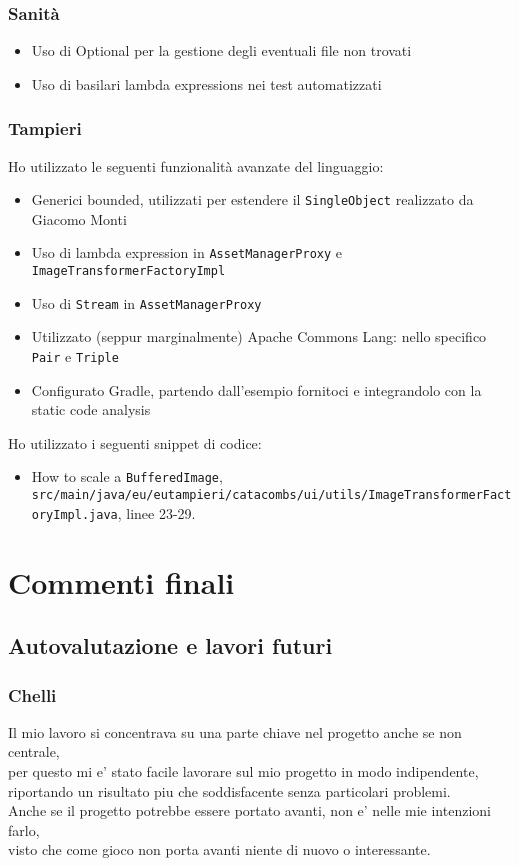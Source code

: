 \documentclass[a4paper,12pt]{report}
\begin{document}
    \subsection{Sanità}
    \begin{itemize}
            \item Uso di Optional per la gestione degli eventuali file non trovati
            \item Uso di basilari lambda expressions nei test automatizzati
    \end{itemize}
    \subsection{Tampieri}
    \par Ho utilizzato le seguenti funzionalità avanzate del linguaggio:
    \begin{itemize}
        \item Generici bounded, utilizzati per estendere il \texttt{SingleObject} realizzato da Giacomo Monti
        \item Uso di lambda expression in \texttt{AssetManagerProxy} e \texttt{ImageTransformerFactoryImpl}
        \item Uso di \texttt{Stream} in \texttt{AssetManagerProxy}
        \item Utilizzato (seppur marginalmente) Apache Commons Lang: nello specifico \texttt{Pair} e \texttt{Triple}
        \item Configurato Gradle, partendo dall'esempio fornitoci e integrandolo con la static code analysis
    \end{itemize}
    \par Ho utilizzato i seguenti snippet di codice:
    \begin{itemize}
        \item How to scale a \texttt{BufferedImage}\cite{so:BufferedImageScaling},\\\texttt{src/main/java/eu/eutampieri/catacombs/ui/utils/ImageTransformerFactoryImpl.java}, linee 23-29.
    \end{itemize}
    \chapter{Commenti finali}
    \section{Autovalutazione e lavori futuri}
    \subsection{Chelli}
    Il mio lavoro si concentrava su una parte chiave nel progetto anche se non centrale,\\
    per questo mi e' stato facile lavorare sul mio progetto in modo indipendente,\\
    riportando un risultato piu che soddisfacente senza particolari problemi.\\
    Anche se il progetto potrebbe essere portato avanti, non e' nelle mie intenzioni farlo,\\
    visto che come gioco non porta avanti niente di nuovo o interessante.\\
\end{document}

